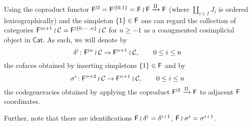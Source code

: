\documentclass[a4paper,10pt]{article}%
\begin{document}
 
\begin{notation}
Using the coproduct functor $\mathsf{F}^{\wr 2} = \mathsf{F}^{\wr \{{0,1\}}} =\mathsf{F} \wr \mathsf{F} \xrightarrow{\amalg} \mathsf{F}$ (where $\coprod_{i\in I} J_i$ is ordered lexicographically) and the simpleton $\{1\} \in \mathsf{F}$
one can regard the collection of categories 
$\mathsf{F}^{\wr n+1 }\wr \mathcal{C} = \mathsf{F}^{\wr \{0,\cdots,n\}} \wr \mathcal{C} $ for $n \geq -1$
 as a coaugmented cosimplicial object in $\mathsf{Cat}$.
As such, we will denote by
\[
	\delta^i\colon \mathsf{F}^{\wr n } \wr \mathcal{C} \to \mathsf{F}^{n+1} \wr \mathcal{C}, \qquad 0 \leq i \leq n
\]
the cofaces obtained by inserting simpletons $\{1\} \in \mathsf{F}$ and by 
\[
	\sigma^i \colon \mathsf{F}^{n+2} \wr \mathcal{C} \to \mathsf{F}^{n+1} \wr \mathcal{C}, \qquad 0 \leq i \leq n
\]
the codegeneracies obtained by applying the coproduct 
$\mathsf{F}^{\wr 2} \xrightarrow{\amalg} \mathsf{F}$ to adjacent 
$\mathsf{F}$ coordinates.

Further, note that there are identifications
$\mathsf{F} \wr \delta^{i} = \delta^{i+1}$, 
$\mathsf{F} \wr \sigma^{i} = \sigma^{i+1}$.
\end{notation}
 
\end{document}

